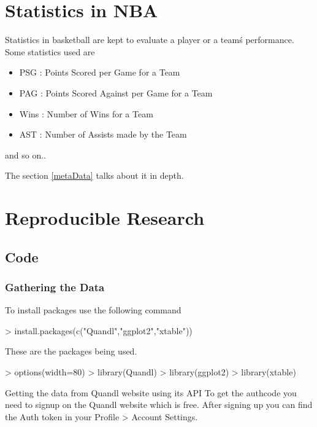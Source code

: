\documentclass[a4paper]{article}
\begin{document}
\section{Statistics in NBA}
Statistics in basketball are kept to evaluate a player or a team\'s performance.
Some statistics used are
\begin{itemize}
\item PSG : Points Scored per Game for a Team
\item PAG : Points Scored Against per Game for a Team
\item Wins : Number of Wins for a Team
\item AST : Number of Assists made by the Team 
\end{itemize}
and so on..

The section \ref{metaData} talks about it in depth.


\section{Reproducible Research}

\subsection{Code}
\subsubsection{Gathering the Data}

To install packages use the following command
\begin{Schunk}
\begin{Sinput}
> install.packages(c("Quandl","ggplot2","xtable"))
\end{Sinput}
\end{Schunk}

These are the packages being used. 

\begin{Schunk}
\begin{Sinput}
> options(width=80)
> library(Quandl)
> library(ggplot2)
> library(xtable)
\end{Sinput}
\end{Schunk}

Getting the data from Quandl website using its API
To get the authcode you need to signup on the Quandl website which is free. After signing up you can find the Auth token in your Profile > Account Settings.
\end{document}
